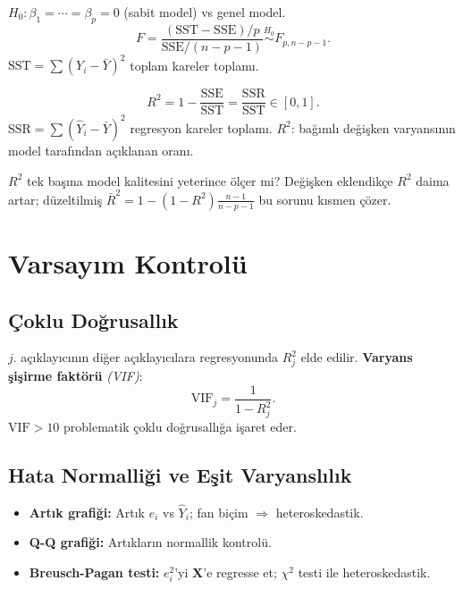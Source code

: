 \begin{teorem}\label{thm:f_test_regresyon}
$H_0:\beta_1=\cdots=\beta_p=0$ (sabit model) vs genel model.
\[
  F = \frac{(\mathrm{SST}-\mathrm{SSE})/p}{\mathrm{SSE}/(n-p-1)} \overset{H_0}{\sim} F_{p,n-p-1}.
\]
$\mathrm{SST}=\sum(Y_i-\bar{Y})^2$ toplam kareler toplamı.
\end{teorem}

\begin{tanim}\label{def:r_kare}
\[
  R^2 = 1 - \frac{\mathrm{SSE}}{\mathrm{SST}} = \frac{\mathrm{SSR}}{\mathrm{SST}} \in [0,1].
\]
$\mathrm{SSR}=\sum(\hat{Y}_i-\bar{Y})^2$ regresyon kareler toplamı. $R^2$: bağımlı değişken varyansının model tarafından açıklanan oranı.
\end{tanim}

\begin{kritiksorgu}
$R^2$ tek başına model kalitesini yeterince ölçer mi? Değişken eklendikçe $R^2$ daima artar; düzeltilmiş $\bar{R}^2 = 1-(1-R^2)\frac{n-1}{n-p-1}$ bu sorunu kısmen çözer.
\end{kritiksorgu}

\section{Varsayım Kontrolü}
\label{sec:varsayim_kontrol}

\subsection{Çoklu Doğrusallık}

\begin{tanim}[VIF]\label{def:vif}
$j$. açıklayıcının diğer açıklayıcılara regresyonunda $R_j^2$ elde edilir. \textbf{Varyans şişirme faktörü} \emph{(VIF)}:
\[
  \mathrm{VIF}_j = \frac{1}{1-R_j^2}.
\]
$\mathrm{VIF}>10$ problematik çoklu doğrusallığa işaret eder.
\end{tanim}

\subsection{Hata Normalliği ve Eşit Varyanslılık}

\begin{itemize}
  \item \textbf{Artık grafiği:} Artık $e_i$ vs $\hat{Y}_i$; fan biçim $\Rightarrow$ heteroskedastik.
  \item \textbf{Q-Q grafiği:} Artıkların normallik kontrolü.
  \item \textbf{Breusch-Pagan testi:} $e_i^2$'yi $\mathbf{X}$'e regresse et; $\chi^2$ testi ile heteroskedastik.
\end{itemize}

